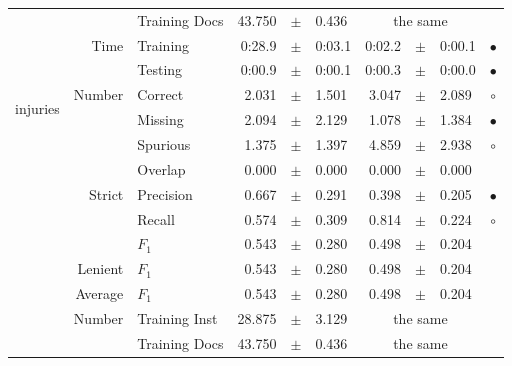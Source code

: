 \begin{longtable}{|r|r|l||rcl|rcl|c|}
\cline{3-10} &                             &   Training Docs &      43.750 &  $\pm$  &       0.436 &    \multicolumn{3}{c|}{the same}         &  \\
\cline{2-10} & \multirow{2}{*}{      Time} &        Training &      0:28.9 &  $\pm$  &      0:03.1 &      0:02.2 &  $\pm$  &      0:00.1 & $\bullet$ \\
\cline{3-10} &                             &         Testing &      0:00.9 &  $\pm$  &      0:00.1 &      0:00.3 &  $\pm$  &      0:00.0 & $\bullet$ \\
\hline
\hline
\multirow{11}{*}{\begin{sideways}injuries\end{sideways} }
             & \multirow{4}{*}{    Number} &         Correct &       2.031 &  $\pm$  &       1.501 &       3.047 &  $\pm$  &       2.089 & $\circ$ \\
\cline{3-10} &                             &         Missing &       2.094 &  $\pm$  &       2.129 &       1.078 &  $\pm$  &       1.384 & $\bullet$ \\
\cline{3-10} &                             &        Spurious &       1.375 &  $\pm$  &       1.397 &       4.859 &  $\pm$  &       2.938 & $\circ$ \\
\cline{3-10} &                             &         Overlap &       0.000 &  $\pm$  &       0.000 &       0.000 &  $\pm$  &       0.000 &  \\
\cline{2-10} & \multirow{3}{*}{    Strict} &       Precision &       0.667 &  $\pm$  &       0.291 &       0.398 &  $\pm$  &       0.205 & $\bullet$ \\
\cline{3-10} &                             &          Recall &       0.574 &  $\pm$  &       0.309 &       0.814 &  $\pm$  &       0.224 & $\circ$ \\
\cline{3-10} &                             &           $F_1$ &       0.543 &  $\pm$  &       0.280 &       0.498 &  $\pm$  &       0.204 &  \\
\cline{2-10} &                     Lenient &           $F_1$ &       0.543 &  $\pm$  &       0.280 &       0.498 &  $\pm$  &       0.204 &  \\
\cline{2-10} &                     Average &           $F_1$ &       0.543 &  $\pm$  &       0.280 &       0.498 &  $\pm$  &       0.204 &  \\
\cline{2-10} & \multirow{2}{*}{    Number} &   Training Inst &      28.875 &  $\pm$  &       3.129 &    \multicolumn{3}{c|}{the same}         &  \\
\cline{3-10} &                             &   Training Docs &      43.750 &  $\pm$  &       0.436 &    \multicolumn{3}{c|}{the same}         &  \\

\end{longtable}
